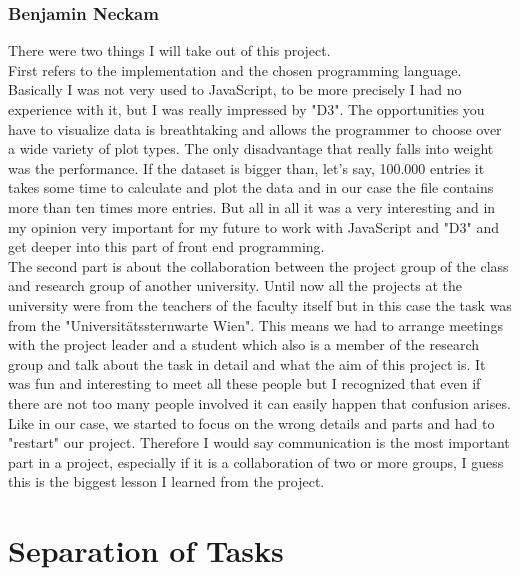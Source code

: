 \documentclass{vgtc}                          %
\begin{document}
\subsubsection{Benjamin Neckam}
There were two things I will take out of this project.\\
First refers to the implementation and the chosen programming language. Basically I was not very used to JavaScript, to be more precisely I had no experience with it, but I was really impressed by "D3". The opportunities you have to visualize data is breathtaking and allows the programmer to choose over a wide variety of plot types. The only disadvantage that really falls into weight was the performance. If the dataset is bigger than, let's say, 100.000 entries it takes some time to calculate and plot the data and in our case the file contains more than ten times more entries. But all in all it was a very interesting and in my opinion very important for my future to work with JavaScript and "D3" and get deeper into this part of front end programming.\\
The second part is about the collaboration between the project group of the class and research group of another university. Until now all the projects at the university were from the teachers of the faculty itself but in this case the task was from the "Universitätssternwarte Wien". This means we had to arrange meetings with the project leader and a student which also is a member of the research group and talk about the task in detail and what the aim of this project is. It was fun and interesting to meet all these people but I recognized that even if there are not too many people involved it can easily happen that confusion arises. Like in our case, we started to focus on the wrong details and parts and had to "restart" our project. Therefore I would say communication is the most important part in a project, especially if it is a collaboration of two or more groups, I guess this is the biggest lesson I learned from the project. 
\section{Separation of Tasks}




\end{document}

